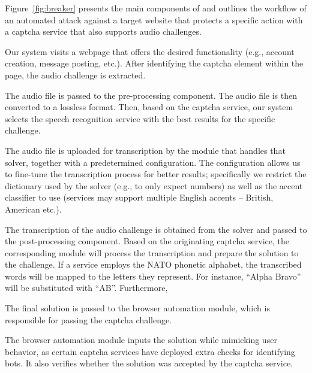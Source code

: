 Figure~\ref{fig:breaker} presents the main components of \system and outlines the workflow of
an automated attack against a target website that protects a specific action with a captcha 
service that also supports audio challenges.

\protect{} Our system visits a webpage that offers the desired functionality 
(e.g., account creation, message posting, etc.). After identifying the captcha element within 
the page, the audio challenge is extracted.

\protect{} The audio file is passed to the pre-processing component. The audio 
file is then converted to a lossless format. Then, based on the captcha service, our system 
selects the speech recognition service with the best results for the specific challenge. 

\protect{} The audio file is uploaded for transcription by the module that handles that solver, 
together with a predetermined configuration. The configuration allows us to fine-tune the transcription process
for better results; specifically we restrict the dictionary used by the solver (e.g., to only expect  
numbers) as well as the accent classifier to use (services may support multiple English accents 
-- British, American etc.).

\protect{} The transcription of the audio challenge is obtained from the solver 
and passed to the post-processing component. Based on the originating captcha service, the corresponding  
module will process the transcription and prepare the solution to the challenge. If a service employs the 
NATO phonetic alphabet, the transcribed words will be mapped to the letters they represent. For instance, 
``Alpha Bravo'' will be substituted with ``AB''. Furthermore, 

\protect{} The final solution is passed to the browser automation module,
which is responsible for passing the captcha challenge.

\protect{} The browser automation module inputs the solution while mimicking 
user behavior, as certain captcha services have deployed extra checks for identifying bots.
It also verifies whether the solution was accepted by the captcha service.

